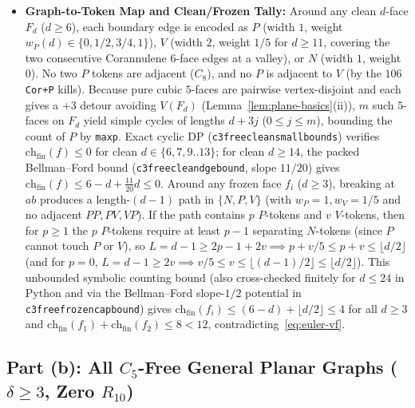 \documentclass[11pt,reqno]{amsart}
\theoremstyle{plain}
\theoremstyle{definition}
\theoremstyle{remark}
\newcommand{\chf}{\mathrm{ch}_{\mathrm{fin}}}
\DeclareRobustCommand{\_}{\ifmmode\text{\textunderscore}\else\textunderscore\allowbreak\fi}
\begin{document}
\begin{itemize}[leftmargin=1.8em]
\[  \]
  kernel-proved in \texttt{c3free\_vertex\_absorption}. Otherwise all $5$ spoke vertices are cubic, and \texttt{check\_cor\_attach} kills all $5$ valley degrees $d \in \{5, 6, 7, 9, 10\}$ ($990 \to 0$ survivors; $1{,}260 = 59 + 105 + 106 + 990$ total $C_3$-free rim kills), so every valley is frozen or clean $\ge 11$ and receives $+1/5$ from $P$.
  \item \textbf{Graph-to-Token Map and Clean/Frozen Tally:} Around any clean $d$-face $F_d$ ($d \ge 6$), each boundary edge is encoded as $P$ (width $1$, weight $w_P(d) \in \{0, 1/2, 3/4, 1\}$), $V$ (width $2$, weight $1/5$ for $d \ge 11$, covering the two consecutive Corannulene $6$-face edges at a valley), or $N$ (width $1$, weight $0$). No two $P$ tokens are adjacent ($C_8$), and no $P$ is adjacent to $V$ (by the $106$ \texttt{Cor+P} kills). Because pure cubic $5$-faces are pairwise vertex-disjoint and each gives a $+3$ detour avoiding $V(F_d)$ (Lemma~\ref{lem:plane-basics}(ii)), $m$ such $5$-faces on $F_d$ yield simple cycles of lengths $d + 3j$ ($0 \le j \le m$), bounding the count of $P$ by \texttt{max\_p}. Exact cyclic DP (\texttt{c3free\_clean\_small\_bounds}) verifies $\chf(f) \le 0$ for clean $d \in \{6, 7, 9..13\}$; for clean $d \ge 14$, the packed Bellman--Ford bound (\texttt{c3free\_clean\_d\_ge\_14\_bound}, slope $11/20$) gives $\chf(f) \le 6 - d + \frac{11}{20} d \le 0$. Around any frozen face $f_i$ ($d \ge 3$), breaking at $ab$ produces a length-$(d-1)$ path in $\{N, P, V\}$ (with $w_P = 1, w_V = 1/5$ and no adjacent $PP, PV, VP$). If the path contains $p$ $P$-tokens and $v$ $V$-tokens, then for $p \ge 1$ the $p$ $P$-tokens require at least $p - 1$ separating $N$-tokens (since $P$ cannot touch $P$ or $V$), so $L = d - 1 \ge 2p - 1 + 2v \implies p + v/5 \le p + v \le \lfloor d/2 \rfloor$ (and for $p = 0$, $L = d - 1 \ge 2v \implies v/5 \le v \le \lfloor (d-1)/2 \rfloor \le \lfloor d/2 \rfloor$). This unbounded symbolic counting bound (also cross-checked finitely for $d \le 24$ in Python and via the Bellman--Ford slope-$1/2$ potential in \texttt{c3free\_frozen\_cap\_bound}) gives $\chf(f_i) \le (6 - d) + \lfloor d/2 \rfloor \le 4$ for all $d \ge 3$ and $\chf(f_1) + \chf(f_2) \le 8 < 12$, contradicting~\eqref{eq:euler-vf}.
\end{itemize}

\subsection{Part (b): All \texorpdfstring{$C_5$}{C5}-Free General Planar Graphs (\texorpdfstring{$\delta \ge 3$}{delta >= 3}, Zero \texorpdfstring{$R_{10}$}{R10})}\label{subsec:c5free}
\end{document}
